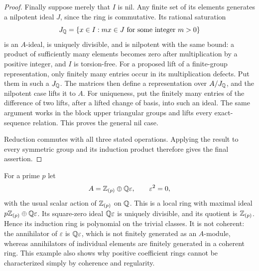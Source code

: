 \begin{proof}
Finally suppose merely that $I$ is nil.  Any finite set of its
elements generates a nilpotent ideal $J$, since the ring is
commutative.  Its rational saturation
\[
 J_{\mathbb Q}=\{x\in I:mx\in J\text{ for some integer }m>0\}
\]
is an $A$-ideal, is uniquely divisible, and is nilpotent with
the same bound: a product of sufficiently many elements becomes
zero after multiplication by a positive integer, and $I$ is
torsion-free.
For a proposed lift of a finite-group representation, only
finitely many entries occur in its multiplication defects.
Put them in such a $J_{\mathbb Q}$.  The matrices then define a
representation over $A/J_{\mathbb Q}$, and the nilpotent case lifts it
to $A$.  For uniqueness, put the finitely many entries of the
difference of two lifts, after a lifted change of basis, into
such an ideal.  The same argument works in the block upper
triangular groups and lifts every exact-sequence relation.
This proves the general nil case.

Reduction commutes with all three stated operations.  Applying
the result to every symmetric group and its induction product
therefore gives the final assertion.
\end{proof}

\begin{example}\label{ex:noncoherent-positive}
For a prime $p$ let
\[
 A=\mathbb Z_{(p)}\oplus\mathbb Q\varepsilon,\qquad\varepsilon^2=0,
\]
with the usual scalar action of $\mathbb Z_{(p)}$ on $\mathbb Q$.
This is a local ring with maximal ideal
$p\mathbb Z_{(p)}\oplus\mathbb Q\varepsilon$.  Its square-zero ideal
$\mathbb Q\varepsilon$ is uniquely divisible, and its quotient is
$\mathbb Z_{(p)}$.  Hence its induction ring is polynomial on the
trivial classes.  It is not coherent: the annihilator of
$\varepsilon$ is $\mathbb Q\varepsilon$, which is not finitely
generated as an $A$-module, whereas annihilators of individual
elements are finitely generated in a coherent ring.
This example also shows why positive coefficient rings cannot
be characterized simply by coherence and regularity.
\end{example}
